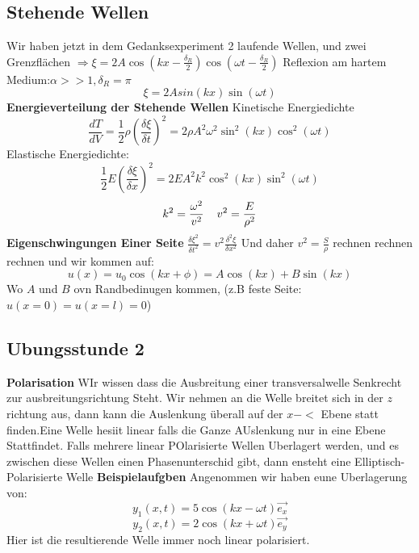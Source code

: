 \documentclass{article}
\newcommand{\mspc}{\hspace{0.4cm}}
\begin{document}
\subsection{Stehende Wellen} Wir haben jetzt in dem Gedanksexperiment 2 laufende Wellen, und zwei Grenzflächen $\Rightarrow \xi=2A\cos(kx-\frac{\delta_R}{2})\cos(\omega t-\frac{\delta_R}{2})$
\newline Reflexion am hartem Medium:$\alpha>>1, \delta_R=\pi$
\[\xi=2Asin(kx)\sin(\omega t)\]
\textbf{Energieverteilung der Stehende Wellen} Kinetische Energiedichte \[\frac{dT}{dV}=\frac{1}{2}\rho\left(\frac{\delta\xi}{\delta t}\right)^2=2\rho A^2\omega^2\sin^2(kx)\cos^2(\omega t)\]
Elastische Energiedichte:
\[\frac{1}{2}E\left(\frac{\delta \xi}{\delta x}\right)^2=2EA^2k^2\cos^2(kx)\sin^2(\omega t)\]
\[k^2=\frac{\omega^2}{v^2}\mspc v^2=\frac{E}{\rho^2}\]
\textbf{Eigenschwingungen Einer Seite} $\frac{\delta\xi^2}{\delta t^2}=v^2\frac{\delta^2\xi}{\delta x^2}$ Und daher $v^2=\frac{S}{\rho}$ rechnen rechnen rechnen und wir kommen auf:
\[u(x)=u_0\cos(kx+\phi)=A\cos(kx)+B\sin(kx)\]
Wo $A$ und $B$ ovn Randbedinugen kommen, (z.B feste Seite: $u(x=0)=u(x=l)=0$)
\subsection{Ubungsstunde 2}
\textbf{Polarisation} WIr wissen dass die Ausbreitung einer transversalwelle Senkrecht zur ausbreitungsrichtung Steht. Wir nehmen an die Welle breitet sich in der $z$ richtung aus, dann kann die Auslenkung überall auf der $x-<$ Ebene statt finden.\newline Eine Welle hesiit linear falls die Ganze AUslenkung nur in eine Ebene Stattfindet.
Falls mehrere linear POlarisierte Wellen Uberlagert werden, und es zwischen diese Wellen einen Phasenunterschid gibt, dann ensteht eine Elliptisch-Polarisierte Welle
\newline\textbf{Beispielaufgben} Angenommen wir haben eune Uberlagerung von:\[y_1(x,t)=5\cos(kx-\omega t)\vec{e_x}\]
\[y_2(x,t)=2\cos(kx+\omega t)\vec{e_y}\]Hier ist die resultierende Welle immer noch linear polarisiert.
\end{document}
